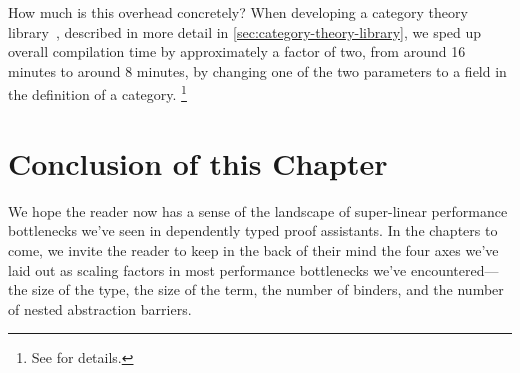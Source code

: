 How much is this overhead concretely?
When developing a category theory library~\cite{category-coq-experience}, described in more detail in \autoref{sec:category-theory-library}, we sped up overall compilation time by approximately a factor of two, from around 16 minutes to around 8 minutes, by changing one of the two parameters to a field in the definition of a category.%
\footnote{%
  See  for details.%
}


\section{Conclusion of this Chapter}

We hope the reader now has a sense of the landscape of super-linear performance bottlenecks we've seen in dependently typed proof assistants.
In the chapters to come, we invite the reader to keep in the back of their mind the four axes we've laid out as scaling factors in most performance bottlenecks we've encountered---the size of the type, the size of the term, the number of binders, and the number of nested abstraction barriers.


